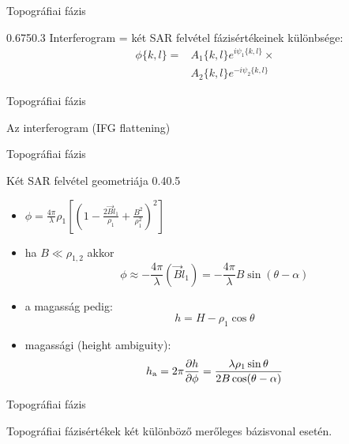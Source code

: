 \def\ft{Topográfiai fázis}


\begin{frame}{\ft}
    \begin{figp}{}{}{0.675}{0.3}
        Interferogram = két SAR felvétel fázisértékeinek különbsége:
        \begin{align*}
            \phi\{k,l\} = & A_1\{k,l\} e^{i\psi_1\{k,l\}} \times \\
                          & A_2\{k,l\} e^{-i\psi_2\{k,l\}}
        \end{align*}
    \end{figp}
\end{frame}


\begin{frame}{\ft}
    \begin{minic}{0.6}
        \centering
        
        Az interferogram  (IFG flattening)
    \end{minic}
\end{frame}



\begin{frame}{\ft}
    \begin{figp}{}{Két SAR felvétel geometriája \cite{BurgmannInSAR}}{0.4}{0.5}
        \begin{itemize}
            \item $\phi = \frac{4\pi}{\lambda}\rho_1\left[\left(1 - \frac{2 \vec{B}\hat{l}_1}{\rho_1} + \frac{B^2}{\rho_1^2}\right)^2\right]$
            \item ha $B \ll \rho_{1,2}$ akkor $$\phi \approx - \frac{4\pi}{\lambda} (\vec{B}\hat{l}_1) = - \frac{4\pi}{\lambda} B \sin(\theta - \alpha)$$
            \item a magasság pedig: $$h = H - \rho_1 \cos\theta$$
            \item magassági  (height ambiguity):
                  $$h_{\text{a}} = 2\pi \frac{\partial h}{\partial \phi} =
                    \frac{\lambda\rho_1\sin\theta}{2B\cos(\theta - \alpha)}$$
        \end{itemize}
    \end{figp}
\end{frame}

\begin{frame}{\ft}
    \centering
    
    Topográfiai fázisértékek két különböző merőleges bázisvonal esetén.
\end{frame}

